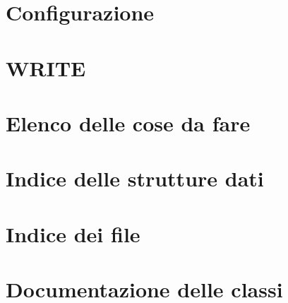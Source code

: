 \documentclass[twoside]{book}
\newcommand{\+}{\discretionary{\mbox{\scriptsize$\hookleftarrow$}}{}{}}
\begin{document}
\chapter{Configurazione}
\label{md_Test}
\hypertarget{md_Test}{}

\chapter{W\+R\+I\+T\+E}
\label{md_WRITE}
\hypertarget{md_WRITE}{}

\chapter{Elenco delle cose da fare}
\label{todo}
\hypertarget{todo}{}

\chapter{Indice delle strutture dati}

\chapter{Indice dei file}

\chapter{Documentazione delle classi}











\end{document}
